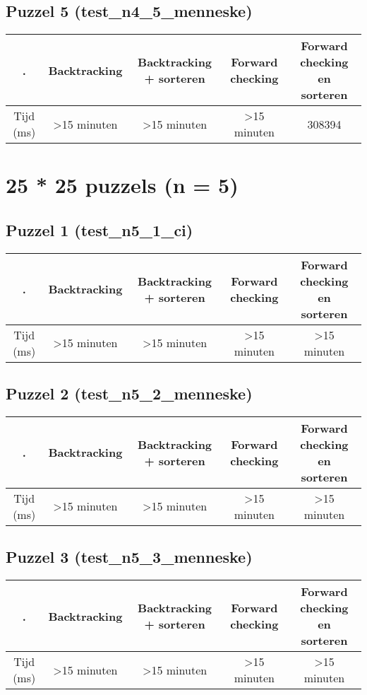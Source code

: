 \documentclass[]{report}
\begin{document}
\begin{appendices}
\subsection{Puzzel 5 (test\_n4\_5\_menneske)}
\begin{tabular}{|c||c|c|c|c|}
\hline . & Backtracking & Backtracking + sorteren & Forward checking & Forward checking en sorteren \\ 
\hline \hline Tijd (ms) & \textgreater 15 minuten & \textgreater 15 minuten & \textgreater 15 minuten & 308394 \\ 
\hline 
\end{tabular}
\section{25 * 25 puzzels (n = 5)}
\subsection{Puzzel 1 (test\_n5\_1\_ci)}
\begin{tabular}{|c||c|c|c|c|}
\hline . & Backtracking & Backtracking + sorteren & Forward checking & Forward checking en sorteren \\ 
\hline \hline Tijd (ms) & \textgreater 15 minuten & \textgreater 15 minuten & \textgreater 15 minuten & \textgreater 15 minuten \\ 
\hline 
\end{tabular}
\subsection{Puzzel 2 (test\_n5\_2\_menneske)}
\begin{tabular}{|c||c|c|c|c|}
\hline . & Backtracking & Backtracking + sorteren & Forward checking & Forward checking en sorteren \\ 
\hline \hline Tijd (ms) & \textgreater 15 minuten & \textgreater 15 minuten & \textgreater 15 minuten & \textgreater 15 minuten \\ 
\hline 
\end{tabular}
\subsection{Puzzel 3 (test\_n5\_3\_menneske)}
\begin{tabular}{|c||c|c|c|c|}
\hline . & Backtracking & Backtracking + sorteren & Forward checking & Forward checking en sorteren \\ 
\hline \hline Tijd (ms) & \textgreater 15 minuten & \textgreater 15 minuten & \textgreater 15 minuten & \textgreater 15 minuten \\ 
\hline 
\end{tabular}

\end{appendices}
\end{document}
